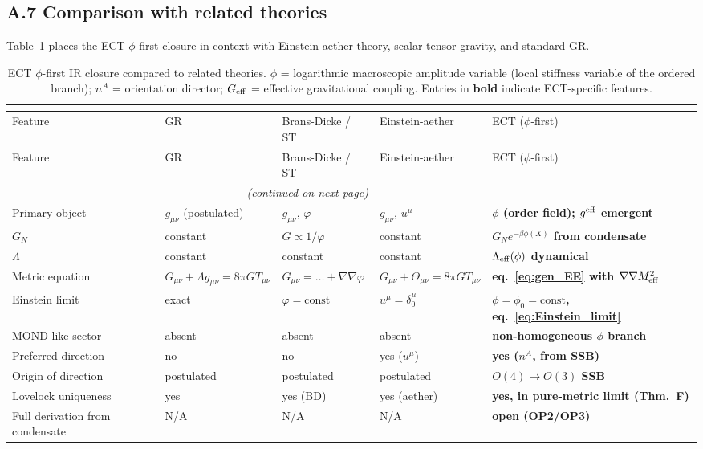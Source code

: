 \documentclass[11pt,a4paper]{article}
\numberwithin{equation}{section}
\begin{document}
\subsection*{A.7 Comparison with related theories}

Table~\ref{tab:phi_first_comparison} places the ECT $\phi$-first
closure in context with Einstein-aether theory, scalar-tensor gravity,
and standard GR.

\begin{longtable}{@{}p{3.2cm}p{3.0cm}p{3.0cm}p{3.0cm}p{3.0cm}@{}}
\caption{ECT $\phi$-first IR closure compared to related theories.
$\phi$ = logarithmic macroscopic amplitude variable (local stiffness variable of the ordered branch);
$n^A$ = orientation director;
$G_{\rm eff}$ = effective gravitational coupling.
Entries in \textbf{bold} indicate ECT-specific features.} \\
\label{tab:phi_first_comparison} \\[-6pt]
\toprule
Feature & GR & Brans-Dicke / ST & Einstein-aether & ECT ($\phi$-first) \\
\midrule
\endfirsthead
\toprule
Feature & GR & Brans-Dicke / ST & Einstein-aether & ECT ($\phi$-first) \\
\midrule
\endhead
\midrule\multicolumn{3}{r}{\small\textit{(continued on next page)}}\\
\endfoot
\bottomrule
\endlastfoot
Primary object & $g_{\mu\nu}$ (postulated) & $g_{\mu\nu},\,\varphi$ & $g_{\mu\nu},\,u^\mu$ &
  \textbf{$\phi$ (order field); $g^{\rm eff}$ emergent} \\
$G_N$ & constant & $G\propto 1/\varphi$ & constant &
  \textbf{$G_N e^{-\beta\phi(X)}$ from condensate} \\
$\Lambda$ & constant & constant & constant &
  \textbf{$\Lambda_{\rm eff}(\phi)$ dynamical} \\
Metric equation & $G_{\mu\nu}+\Lambda g_{\mu\nu}=8\pi G T_{\mu\nu}$ &
  $G_{\mu\nu}=\ldots+\nabla\nabla\varphi$ &
  $G_{\mu\nu}+\Theta_{\mu\nu}=8\pi G T_{\mu\nu}$ &
  \textbf{eq.~\eqref{eq:gen_EE} with $\nabla\nabla M^2_{\rm eff}$} \\
Einstein limit & exact & $\varphi=\mathrm{const}$ & $u^\mu=\delta^\mu_0$ &
  \textbf{$\phi=\phi_0=\mathrm{const}$, eq.~\eqref{eq:Einstein_limit}} \\
MOND-like sector & absent & absent & absent &
  \textbf{non-homogeneous $\phi$ branch} \\
Preferred direction & no & no & yes ($u^\mu$) &
  \textbf{yes ($n^A$, from SSB)} \\
Origin of direction & postulated & postulated & postulated &
  \textbf{$O(4)\to O(3)$ SSB} \\
Lovelock uniqueness & yes & yes (BD) & yes (aether) &
  \textbf{yes, in pure-metric limit (Thm.~F)} \\
Full derivation from condensate & N/A & N/A & N/A &
  \textbf{open (OP2/OP3)} \\

\end{longtable}
\end{document}
